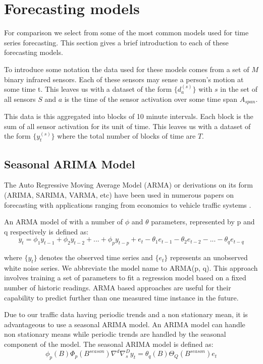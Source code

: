\documentclass{acm_proc_article-sp}
\begin{document}
\section{Forecasting models}
For comparison we select from some of the most common models used for time series forecasting.  This section gives a brief introduction to each of these forecasting models. 

To introduce some notation the data used for these models comes from a set of $M$ binary infrared sensors.  Each of these sensors may sense a person's motion at some time t.  This leaves us with a dataset of the form $\{d^{(s)}_{a}\}$ with $s$ in the set of all sensors $S$ and $a$ is the time of the sensor activation over some time span $A_{span}$.

This data is this aggregated into blocks of 10 minute intervals.  Each block is the sum of all sensor activation for its unit of time.  This leaves us with a dataset of the form $\{y^{(s)}_{t}\}$ where the total number of blocks of time are $T$.

\subsection{Seasonal ARIMA Model}
The Auto Regressive Moving Average Model (ARMA) or derivations on its form (ARIMA, SARIMA, VARMA, etc) have been used in numerous papers on forecasting with applications ranging from economics to vehicle traffic systems \cite{Williams2003, Hong2011}.  

An ARMA model of with a number of $\phi$ and $\theta$ parameters, represented by p and q respectively is defined as: 
\begin{equation}
y_{t} = \phi_{1}y_{t-1} + \phi_{2}y_{t-2} + ... + \phi_{p}y_{t-p} + e_{t} - \theta_{1}e_{t-1} - \theta_{2}e_{t-2} - ... - \theta_{q}e_{t-q}
\end{equation}

\noindent
where $\{y_{t}\}$ denotes the observed time series and $\{e_t\}$ represents an unobserved white noise series.  We abbreviate the model name to ARMA(p, q).  This approach involves training a set of parameters to fit a regression model based on a fixed number of historic readings.  ARMA based approaches are useful for their capability to predict further than one measured time instance in the future.  

Due to our traffic data having periodic trends and a non stationary mean, it is advantageous to use a seasonal ARIMA model.  An ARIMA model can handle non stationary means while periodic trends are handled by the seasonal component of the model.  The seasonal ARIMA model is defined as:
\begin{equation}
\label{eq:sarima}
\phi_{p}(B)\Phi_{p}(B^{season})\nabla^{d}\nabla^{D}_{s}y_{t} = \theta_{q}(B)\Theta_{Q}(B^{season})e_{t}
\end{equation}
\end{document}
